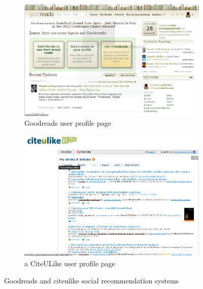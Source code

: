 \documentclass[12pt,a4paper]{article}
\begin{document}
\begin{figure}[!hbt]
        \centering
        \begin{subfigure}[b]{0.50\textwidth}
                \centering
                \includegraphics[width=\textwidth]{images/goodreads_index.png}
                \caption{Goodreads user profile page}
                \label{fig:goodreads_index}
        \end{subfigure}%
        \begin{subfigure}[b]{0.50\textwidth}
                \centering
                \includegraphics[width=\textwidth]{images/citeulike_index.png}
                \caption{a CiteULike user profile page}
                \label{fig:citeulike_index}
        \end{subfigure}

        \caption{Goodreads and citeulike social recommendation systems}
        \label{fig:social_indexes}
\end{figure}
\end{document}
